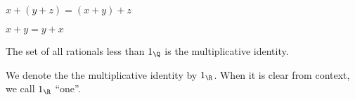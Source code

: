 \begin{proposition}[Associative]
$x + (y + z) = (x + y) + z$
\end{proposition}

\begin{proposition}[Commutative]
$x + y = y + x$
\end{proposition}

\begin{proposition}[Identity]
The set of all rationals less than $1_{\Q }$ is the multiplicative identity.
\end{proposition}

We denote the the multiplicative identity by $1_{\R }$.
When it is clear from context, we call $1_{\R }$ ``one''.
